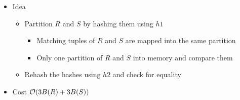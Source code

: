 \begin{itemize}
\begin{itemize}
                \begin{itemize}
                    \ipro Deals with the case where the hash table does not fit into memory
                    \item Idea
                        \begin{itemize}
                            \item Partition $R$ and $S$ by hashing them using $h1$
                                \begin{itemize}
                                    \item Matching tuples of $R$ and $S$ are mapped into the same partition
                                    \item Only one partition of $R$ and $S$ into memory and compare them
                                \end{itemize}
                            \item Rehash the hashes using $h2$ and check for equality
                        \end{itemize}
                    \item Cost $\mathcal{O}(3B(R) + 3B(S))$
                \end{itemize}
        \end{itemize}
\end{itemize}

